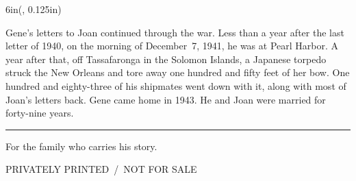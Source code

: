 \documentclass[12pt]{article}
\def\TRIMW{6in}
\def\BLEED{0.125in}
\newlength{\backX}  \setlength{\backX}{\BLEED}
\begin{document}
\begin{textblock*}{\TRIMW}(\backX, \BLEED)%
    \color{ink}
    \vspace*{1.2in}
    \begin{center}
        \begin{minipage}{4.4in}
            \bodyfont\itshape\small\color{walnut}

            Gene's letters to Joan continued through the war. Less than a
            year after the last letter of 1940, on the morning of December~7,
            1941, he was at Pearl Harbor. A year after that, off Tassafaronga
            in the Solomon Islands, a Japanese torpedo struck the New Orleans
            and tore away one hundred and fifty feet of her bow. One hundred
            and eighty-three of his shipmates went down with it, along with
            most of Joan's letters back. Gene came home in 1943. He and Joan
            were married for forty-nine years.

            \vspace{1.4em}
            \rule{1.2in}{0.4pt}
            \vspace{0.6em}

            For the family who carries his story.
        \end{minipage}
    \end{center}
    \vfill
    \begin{center}
        {\monofont\footnotesize{}\color{walnutmute}
            PRIVATELY PRINTED \,/\, NOT FOR SALE\par}
    \end{center}
    \vspace*{0.8in}
\end{textblock*}

\null
\end{document}
